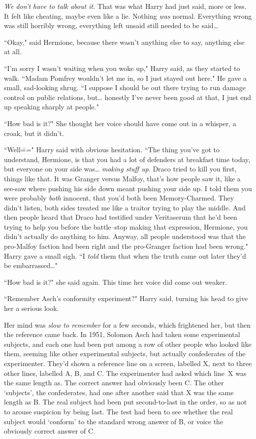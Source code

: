 \emph{We don't have to talk about it.} That was what Harry had just said, more or less. It felt like cheating, maybe even like a lie. Nothing \emph{was} normal. Everything wrong was still horribly wrong, everything left unsaid still needed to be said{\ldots}

``Okay," said Hermione, because there wasn't anything else to say, anything else at all.

``I'm sorry I wasn't waiting when you woke up," Harry said, as they started to walk. ``Madam Pomfrey wouldn't let me in, so I just stayed out here." He gave a small, sad-looking shrug. ``I suppose I should be out there trying to run damage control on public relations, but{\ldots} honestly I've never been good at that, I just end up speaking sharply at people."

``How bad is it?" She thought her voice should have come out in a whisper, a croak, but it didn't.

``Well\===" Harry said with obvious hesitation. ``The thing you've got to understand, Hermione, is that you had a lot of defenders at breakfast time today, but everyone on your side was{\ldots} \emph{making stuff up}. Draco tried to kill you first, things like that. It was Granger versus Malfoy, that's how people saw it, like a see-saw where pushing his side down meant pushing your side up. I told them you were probably \emph{both} innocent, that you'd both been Memory-Charmed. They didn't listen, both sides treated me like a traitor trying to play the middle. And then people heard that Draco had testified under Veritaserum that he'd been trying to help you before the battle\---stop making that expression, Hermione, you didn't actually do anything to him. Anyway, all people understood was that the pro-Malfoy faction had been right and the pro-Granger faction had been wrong." Harry gave a small sigh. ``I \emph{told} them that when the truth came out later they'd be embarrassed{\ldots}"

``How bad is it?" she said again. This time her voice did come out weaker.

``Remember Asch's conformity experiment?" Harry said, turning his head to give her a serious look.

Her mind was \emph{slow to remember} for a few seconds, which frightened her, but then the reference came back. In 1951, Solomon Asch had taken some experimental subjects, and each one had been put among a row of other people who looked like them, seeming like other experimental subjects, but actually confederates of the experimenter. They'd shown a reference line on a screen, labelled X, next to three other lines, labelled A, B, and C\@. The experimenter had asked which line~X was the same length as. The correct answer had obviously been C\@. The other `subjects', the confederates, had one after another said that X was the same length as B\@. The real subject had been put second-to-last in the order, so as not to arouse suspicion by being last. The test had been to see whether the real subject would `conform' to the standard wrong answer of B, or voice the obviously correct answer of C\@.

